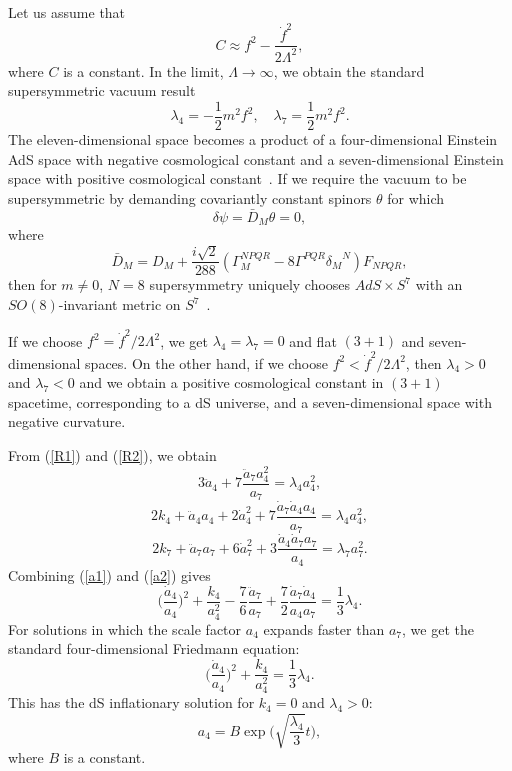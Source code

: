\documentclass[a4paper,12pt]{article}
\begin{document}
Let us assume that
\begin{equation}
\label{Cconstant}
C\approx f^2-\frac{{\dot f}^2}{2\Lambda^2},
\end{equation}
where $C$ is a constant. In the
limit, $\Lambda\rightarrow\infty$, we obtain the standard supersymmetric
vacuum result
\begin{equation}
\lambda_4=-\frac{1}{2}m^2f^2,\quad \lambda_7=\frac{1}{2}m^2f^2.
\end{equation}
The eleven-dimensional space becomes a product of a four-dimensional
Einstein AdS space with negative
cosmological constant and a seven-dimensional Einstein space with positive
cosmological constant~\cite{Duff2}.
If we require the vacuum to be supersymmetric by
demanding covariantly constant spinors $\theta$ for which
\begin{equation}
\delta\psi={\bar D}_M\theta=0,
\end{equation}
where
\begin{equation}
{\bar D}_M=D_M+\frac{i\sqrt{2}}{288}(\Gamma^{NPQR}_M-8\Gamma^{PQR}
{\delta_M}^N)F_{NPQR},
\end{equation}
then for $m\not= 0$, $N=8$ supersymmetry uniquely chooses $AdS\times S^7$
with an $SO(8)$-invariant metric on $S^7$~\cite{Englert,Duff2}.

If we choose
$f^2={\dot f}^2/2\Lambda^2$, we get $\lambda_4=\lambda_7=0$ and flat
$(3+1)$ and seven-dimensional spaces. On the other hand, if we choose $f^2
< {\dot f^2}/2\Lambda^2$, then $\lambda_4 > 0$ and $\lambda_7 < 0$ and we
obtain a positive cosmological constant in $(3+1)$ spacetime,
corresponding to a dS universe, and a seven-dimensional space
with negative curvature.

From (\ref{R1}) and (\ref{R2}), we obtain
\begin{equation}
\label{a1}
3{\ddot a}_4+7\frac{{\ddot a}_7a^2_4}{a_7}=\lambda_4a^2_4,
\end{equation}
\begin{equation}
\label{a2}
2k_4+{\ddot a}_4a_4+2{\dot a}^2_4+7\frac{{\dot a}_7{\dot
a}_4a_4}{a_7}=\lambda_4a^2_4,
\end{equation}
\begin{equation}
2k_7+{\ddot a}_7a_7+6{\dot a}^2_7
+3\frac{{\dot a}_4{\dot a}_7a_7}{a_4}=\lambda_7a^2_7.
\end{equation}
Combining (\ref{a1}) and (\ref{a2}) gives
\begin{equation}
\biggl(\frac{{\dot a}_4}{a_4}\biggr)^2+\frac{k_4}{a^2_4}
-\frac{7}{6}\frac{{\ddot a}_7}{a_7}
+\frac{7}{2}\frac{{\dot a}_7{\dot a}_4}{a_4a_7}=\frac{1}{3}\lambda_4.
\end{equation}
For solutions in which the scale factor $a_4$ expands
faster than $a_7$, we get the standard four-dimensional Friedmann equation:
\begin{equation}
\biggl(\frac{{\dot a}_4}{a_4}\biggr)^2
+\frac{k_4}{a^2_4}=\frac{1}{3}\lambda_4.
\end{equation}
This has the dS inflationary solution for $k_4=0$ and $\lambda_4
> 0$:
\begin{equation}
a_4=B\exp\biggl(\sqrt{\frac{\lambda_4}{3}}t\biggr),
\end{equation}
where $B$ is a constant.
\end{document}
